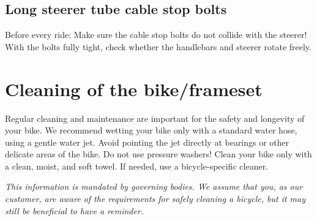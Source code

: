 \documentclass[12 pt]{article}
\newcommand{\bodyimage}[1]{\rightline{}}}
\begin{document}
\bodyimage{7_2_specs_to_respect_bottle.svg}

\subsection{Long steerer tube cable stop bolts}

Before every ride: Make sure the cable stop bolts do not collide with
the steerer! With the bolts fully tight, check whether the handlebars
and steerer rotate freely.

\bodyimage{7_3_specs_to_respect_cable_stops.svg}

\section{Cleaning of the bike/frameset}

Regular cleaning and maintenance are important for the safety and
longevity of your bike. We recommend wetting your bike only with a
standard water hose, using a gentle water jet. Avoid pointing the jet
directly at bearings or other delicate areas of the bike. Do not use
pressure washers! Clean your bike only with a clean, moist, and soft
towel. If needed, use a bicycle-specific cleaner.

{\it *This information is mandated by governing bodies. We assume that
  you, as our customer, are aware of the requirements for safely
  cleaning a bicycle, but it may still be beneficial to have a
  reminder.}
\end{document}
